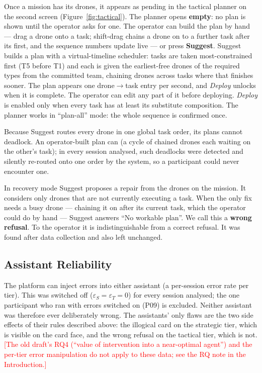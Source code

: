 \documentclass[10pt]{article}
\theoremstyle{definition}
\newcommand{\todo}[1]{\textcolor{red}{[#1]}}
\begin{document}
Once a mission has its drones, it appears as pending in the tactical planner on the second screen
(Figure~\ref{fig:tactical}). The planner opens \textbf{empty}: no plan is shown until the operator asks for one.
The operator can build the plan by hand --- drag a drone onto a task; shift-drag chains a drone on to a further task
after its first, and the sequence numbers update live --- or press \textbf{Suggest}. Suggest builds a plan with a
virtual-timeline scheduler: tasks are taken most-constrained first (T5 before T1) and each is given the earliest-free
drones of the required types from the committed team, chaining drones across tasks where that finishes sooner. The
plan appears one drone$\rightarrow$task entry per second, and \emph{Deploy} unlocks when it is complete. The operator
can edit any part of it before deploying. \emph{Deploy} is enabled only when every task has at least its substitute
composition. The planner works in ``plan-all'' mode: the whole sequence is confirmed once.

Because Suggest routes every drone in one global task order, its plans cannot deadlock. An operator-built plan can (a
cycle of chained drones each waiting on the other's task); in every session analysed, such deadlocks were detected
and silently re-routed onto one order by the system, so a participant could never encounter one.

In recovery mode Suggest proposes a repair from the drones on the mission. It considers only drones that are not
currently executing a task. When the only fix needs a busy drone --- chaining it on after its current task, which
the operator could do by hand --- Suggest answers ``No workable plan''. We call this a \textbf{wrong refusal}.
To the operator it is indistinguishable from a correct refusal. It was found after data collection and also left
unchanged.

\subsection{Assistant Reliability}\label{sec:reliability}

The platform can inject errors into either assistant (a per-session error rate per tier). This was switched off
($\varepsilon_S = \varepsilon_T = 0$) for every session analysed; the one participant who ran with errors switched on
(P09) is excluded. Neither assistant was therefore ever deliberately wrong. The assistants' only flaws are the two
side effects of their rules described above: the illogical card on the strategic tier, which is visible on the card
face, and the wrong refusal on the tactical tier, which is not. \todo{The old draft's RQ4 (``value of intervention
into a near-optimal agent'') and the per-tier error manipulation do not apply to these data; see the RQ note in the
Introduction.}
\end{document}

